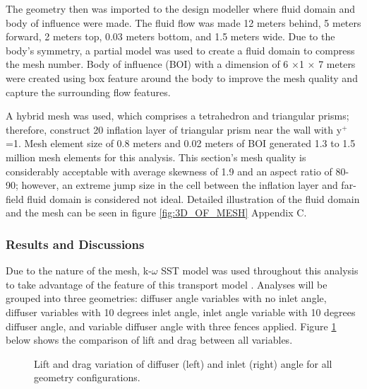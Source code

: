 \noindent The geometry then was imported to the design modeller where fluid domain and body of influence were made. The fluid flow was made 12 meters behind, 5 meters forward, 2 meters top, 0.03 meters bottom, and 1.5 meters wide. Due to the body's symmetry, a partial model was used to create a fluid domain to compress the mesh number. Body of influence (BOI) with a dimension of  6 $\times$1 $\times$ 7 meters were created using box feature around the body to improve the mesh quality and capture the surrounding flow features.  

\noindent A hybrid mesh was used, which comprises a tetrahedron and triangular prisms; therefore, construct 20 inflation layer of triangular prism near the wall with y$^+$=1.  Mesh element size of 0.8 meters and 0.02 meters of BOI generated 1.3 to 1.5 million mesh elements for this analysis. This section's mesh quality is considerably acceptable with average skewness of 1.9 and an aspect ratio of 80-90; however, an extreme jump size in the cell between the inflation layer and far-field fluid domain  is considered not ideal. Detailed illustration of the fluid domain and the mesh can be seen in figure \ref{fig:3D_OF_MESH} Appendix C.





\subsubsection{Results and Discussions}
Due to the nature of the mesh, k-$\omega$ SST model was used throughout this analysis to take advantage of the feature of this transport model \cite{Ansys2006ModelingFlows}. Analyses will be grouped into three geometries: diffuser angle variables with no inlet angle, diffuser variables with 10 degrees inlet angle, inlet angle variable with 10 degrees diffuser angle, and variable diffuser angle with three fences applied.  Figure \ref{fig:3D_OF_PLOT_COMPARE_ALL} below shows the comparison of lift and drag between all variables.

\begin{figure}[htb!]
    \centering
    \noindent{}
    \caption{Lift and drag variation of diffuser (left) and inlet (right) angle for all geometry configurations.}
    \label{fig:3D_OF_PLOT_COMPARE_ALL}
\end{figure}

